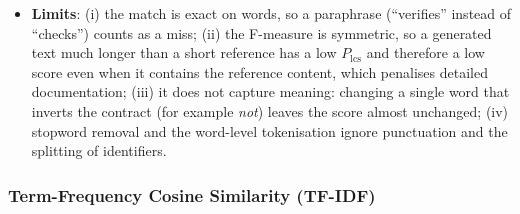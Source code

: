\begin{itemize}[leftmargin=*, label=\textbullet]
	\item \textbf{Limits}: (i) the match is exact on words, so a paraphrase (``verifies'' instead of
	``checks'') counts as a miss; (ii) the F-measure is symmetric, so a generated text much longer
	than a short reference has a low $P_{\mathrm{lcs}}$ and therefore a low score even when it
	contains the reference content, which penalises detailed documentation; (iii) it does not
	capture meaning: changing a single word that inverts the contract (for example \emph{not}) leaves
	the score almost unchanged; (iv) stopword removal and the word-level tokenisation ignore
	punctuation and the splitting of identifiers.
\end{itemize}

\subsubsection{Term-Frequency Cosine Similarity (TF-IDF)}
\label{subsubsec:tf_cosine}
